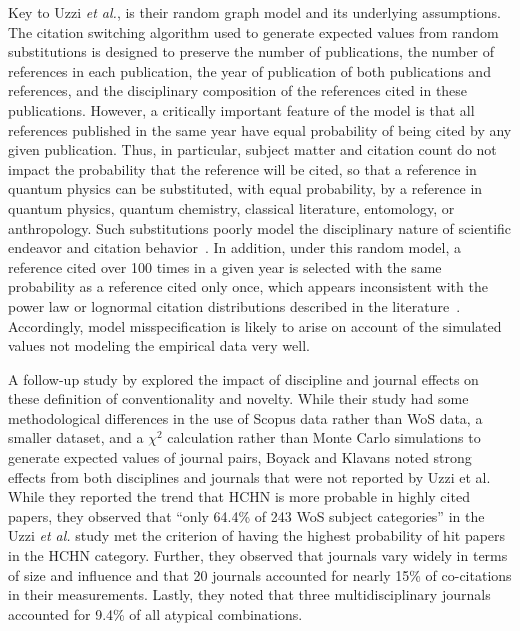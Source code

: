 \documentclass[NETN]{stjour}
\begin{document}
Key to Uzzi {\em et al.}, is their random graph model and its underlying assumptions. The citation switching algorithm used to generate expected values from random substitutions is designed to preserve the number of publications, the number of references in each publication, the year of publication of both publications and references, and the disciplinary composition of the references cited in these publications. However, a critically important feature of the model is that all references published in the same year have equal probability of being cited by any given publication.
Thus, in particular,  subject matter and  citation count do not impact the probability that the reference will be cited, so that  a reference in quantum physics can be substituted, with equal probability, by a reference in quantum physics, quantum chemistry, classical literature, entomology, or anthropology. Such substitutions poorly model the disciplinary nature of scientific endeavor and citation behavior~\citep{wallace_lariviere_gingras_2012,moed_measuring_2010,klavans_research_2017,garfield_1979}. In addition, under this random model, a reference cited over 100 times in a given year is selected with the same probability as a reference cited only once, which appears inconsistent with the power law or lognormal citation distributions described in the literature~\citep{stringer_statistical_2010,perline_strong_2005}.  Accordingly, model misspecification is likely to arise on account of the simulated values not modeling the empirical data very well. 

A follow-up study by \cite{boyack_vs_uzzi_2014} explored the impact of discipline and journal effects on these definition of conventionality and novelty.  While their study had some methodological differences in the use of Scopus data rather than WoS data, a smaller dataset, and a $\chi^2$ calculation rather than Monte Carlo simulations to generate expected values of journal pairs, Boyack and Klavans noted strong effects from both disciplines and journals that were not reported by Uzzi et al. While they reported the trend that HCHN is more probable in highly cited papers, they observed that ``only 64.4\%  of  243  WoS  subject  categories'' in the Uzzi {\em et al.} study met the criterion of having the highest probability of hit papers in the HCHN category.  Further, they observed that journals vary widely in terms of size and influence and that 20 journals accounted for nearly 15\% of co-citations in their measurements. Lastly, they noted that three multidisciplinary journals accounted for 9.4\% of all atypical combinations. 
\end{document}
